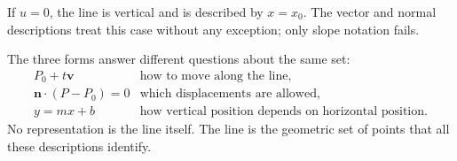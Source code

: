 \begin{remarkbox}
If $u=0$, the line is vertical and is described by $x=x_0$. The vector and
normal descriptions treat this case without any exception; only slope notation
fails.
\end{remarkbox}

\begin{summarybox}
The three forms answer different questions about the same set:
\[
\begin{array}{c|c}
P_0+t\mathbf v & \text{how to move along the line},\\
\mathbf n\cdot(P-P_0)=0 & \text{which displacements are allowed},\\
y=mx+b & \text{how vertical position depends on horizontal position}.
\end{array}
\]
No representation is the line itself. The line is the geometric set of points
that all these descriptions identify.
\end{summarybox}
